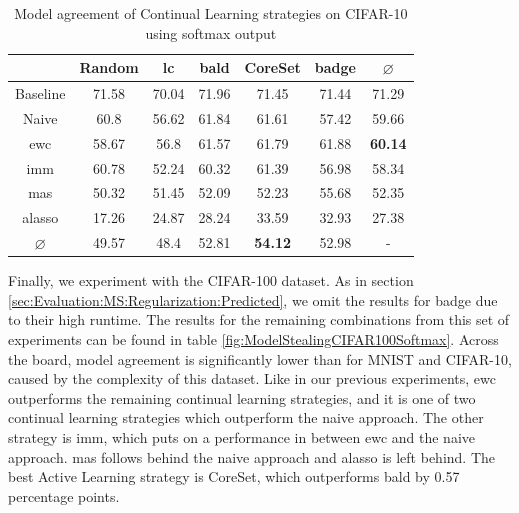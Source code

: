 \begin{table}[h]
    \centering
    \begin{tabular}{ c | c c c c c | c } 
         & Random & \gls{lc} & \gls{bald} & CoreSet & \gls{badge} & $\varnothing$\\ 
        \hline 
        Baseline & 71.58 & 70.04 & 71.96 & 71.45 & 71.44 & 71.29\\
        \hline
        Naive & 60.8 & 56.62 & 61.84 & 61.61 & 57.42 & 59.66 \\
        \gls{ewc} & 58.67 & 56.8 & 61.57 & 61.79 & 61.88 & \textbf{60.14}\\
        \gls{imm} & 60.78 & 52.24 & 60.32 & 61.39 & 56.98 & 58.34 \\
        \gls{mas} & 50.32 & 51.45 & 52.09 & 52.23 & 55.68 & 52.35\\
        \gls{alasso} & 17.26 & 24.87 & 28.24 & 33.59 & 32.93 & 27.38\\
        \hline
        $\varnothing$ & 49.57 & 48.4 & 52.81 & \textbf{54.12} & 52.98 & -\\
    \end{tabular}
    \caption{Model agreement of Continual Learning strategies on CIFAR-10 using softmax output}
    \label{fig:ModelStealingCIFAR10Softmax}
\end{table}


Finally, we experiment with the CIFAR-100 dataset. As in section \ref{sec:Evaluation:MS:Regularization:Predicted}, we omit the results for \gls{badge} due to their high runtime.
The results for the remaining combinations from this set of experiments can be found in table \ref{fig:ModelStealingCIFAR100Softmax}. Across the board, model agreement is
significantly lower than for MNIST and CIFAR-10, caused by the complexity of this dataset. Like in our previous experiments,
\gls{ewc} outperforms the remaining continual learning strategies, and it is one of two continual learning strategies which outperform the naive approach.
The other strategy is \gls{imm}, which puts on a performance in between \gls{ewc} and the naive approach. \gls{mas} follows behind the naive approach
and \gls{alasso} is left behind. The best Active Learning strategy is CoreSet, which outperforms \gls{bald} by 0.57 percentage points.\par

